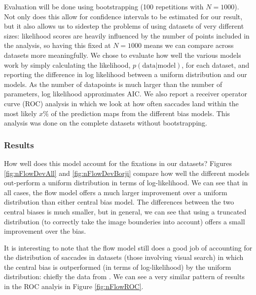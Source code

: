 \documentclass[a4paper, twocolumn, oneside, 11pt]{article}
\begin{document}
Evaluation will be done using bootstrapping (100 repetitions with $N=1000$). Not only does  this allow for confidence intervals to be estimated for our result, but it also allows us to sidestep the problems of using datasets of very different sizes: likelihood scores are heavily influenced by the number of points included in the analysis, so having this fixed at $N=1000$ means we can compare across datasets more meaningfully. We chose to evaluate how well the various models work by simply calculating the likelihood, $p(\text{data}|\text{model})$, for each dataset, and reporting the difference in log likelihood between a uniform distribution and our models. As the number of datapoints is much larger than the number of parameters, log likelihood approximates AIC. We also report a receiver operator curve (ROC) \citep{green-swets1966} analysis in which we look at how often saccades land within the most likely $x\%$ of the prediction maps from the different bias models. This analysis was done on the complete datasets without bootstrapping.

\subsubsection{Results}

How well does this model account for the fixations in our datasets? Figures \ref{fig:nFlowDevAll} and \ref{fig:nFlowDevBorji} compare how well the different models out-perform a uniform distribution in terms of log-likelihood. We can see that in all cases, the flow model offers a much larger improvement over a uniform distribution than either central bias model. The differences between the two central biases is much smaller, but in general, we can see that using a truncated distribution (to correctly take the image bounderies into account) offers a small improvement over the \cite{clarke-tatler2014} bias. 

It is interesting to note that the flow model still does a good job of accounting for the distribution of saccades in datasets (those involving visual search) in which the central bias is outperformed (in terms of log-likelihood) by the uniform distribution: chiefly the data from \cite{clarke2009,asher2013,tatler2007}. We can see a very similar pattern of results in the ROC analyis in Figure \ref{fig:nFlowROC}.
\end{document}
